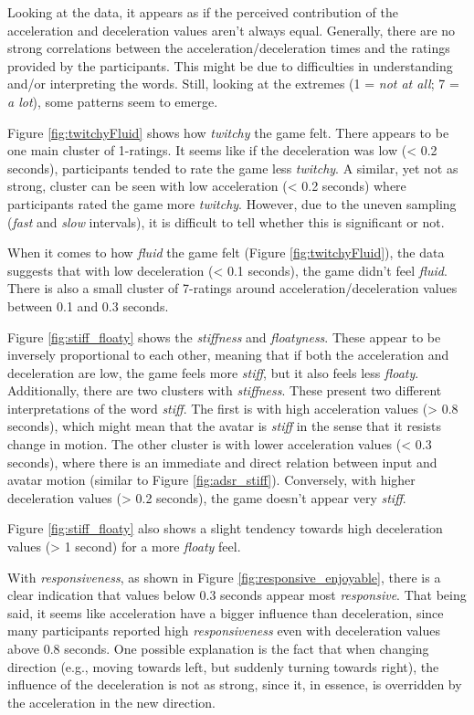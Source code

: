 Looking at the data, it appears as if the perceived contribution of the acceleration and deceleration values aren't always equal. Generally, there are no strong correlations between the acceleration/deceleration times and the ratings provided by the participants. This might be due to difficulties in understanding and/or interpreting the words. Still, looking at the extremes (1 = \textit{not at all}; 7 = \textit{a lot}), some patterns seem to emerge.

Figure \ref{fig:twitchyFluid} shows  how \textit{twitchy} the game felt. There appears to be one main cluster of 1-ratings. It seems like if the deceleration was low (< 0.2 seconds), participants tended to rate the game less \textit{twitchy}. A similar, yet not as strong, cluster can be seen with low acceleration (< 0.2 seconds) where participants rated the game more \textit{twitchy}. However, due to the uneven sampling (\textit{fast} and \textit{slow} intervals), it is difficult to tell whether this is significant or not.

When it comes to how \textit{fluid} the game felt (Figure \ref{fig:twitchyFluid}), the data suggests that with low deceleration (< 0.1 seconds), the game didn't feel \textit{fluid}. There is also a small cluster of 7-ratings around acceleration/deceleration values between 0.1 and 0.3 seconds.

Figure \ref{fig:stiff_floaty} shows the \textit{stiffness} and \textit{floatyness}. These appear to be inversely proportional to each other, meaning that if both the acceleration and deceleration are low, the game feels more \textit{stiff}, but it also feels less \textit{floaty}. Additionally, there are two clusters with \textit{stiffness}. These present two different interpretations of the word \textit{stiff}. The first is with high acceleration values (> 0.8 seconds), which might mean that the avatar is \textit{stiff} in the sense that it resists change in motion. The other cluster is with lower acceleration values (< 0.3 seconds), where there is an immediate and direct relation between input and avatar motion (similar to Figure \ref{fig:adsr_stiff}). Conversely, with higher deceleration values (> 0.2 seconds), the game doesn't appear very \textit{stiff}.

Figure \ref{fig:stiff_floaty} also shows a slight tendency towards high deceleration values (> 1 second) for a more \textit{floaty} feel.

With \textit{responsiveness}, as shown in Figure \ref{fig:responsive_enjoyable}, there is a clear indication that values below 0.3 seconds appear most \textit{responsive}. That being said, it seems like acceleration have a bigger influence than deceleration, since many participants reported high \textit{responsiveness} even with deceleration values above 0.8 seconds. One possible explanation is the fact that when changing direction (e.g., moving towards left, but suddenly turning towards right), the influence of the deceleration is not as strong, since it, in essence, is overridden by the acceleration in the new direction.

